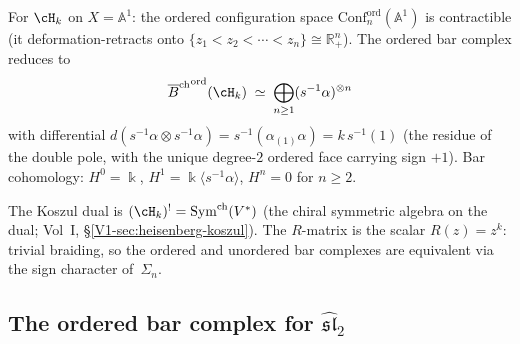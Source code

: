 \begin{computation}
For $\cH_k$ on $X=\mathbb A^1$: the ordered configuration
space $\mathrm{Conf}_n^{\mathrm{ord}}(\mathbb A^1)$ is
contractible (it deformation-retracts onto
$\{z_1<z_2<\cdots<z_n\}\cong\mathbb R^n_+$).
The ordered bar complex reduces to
\[
{\Barch}^{\mathrm{ord}}(\cH_k)
\;\simeq\;
\bigoplus_{n\ge 1}(s^{-1}\alpha)^{\otimes n}
\]
with differential $d(s^{-1}\alpha\otimes s^{-1}\alpha)
=s^{-1}(\alpha_{(1)}\alpha)=k\,s^{-1}(1)$
(the residue of the double pole, with the unique degree-$2$ ordered
face carrying sign \(+1\)). Bar cohomology:
$H^0=\Bbbk$, $H^1=\Bbbk\langle s^{-1}\alpha\rangle$,
$H^n=0$ for $n\ge 2$.

The Koszul dual is $(\cH_k)^!=\mathrm{Sym}^{\mathrm{ch}}(V^*)$
(the chiral symmetric algebra on the dual; Vol~I, \S\ref*{V1-sec:heisenberg-koszul}). The $R$-matrix is
the scalar $R(z)=z^k$: trivial braiding, so the ordered
and unordered bar complexes are equivalent via the sign
character of~$\Sigma_n$.
\end{computation}

\subsection{The ordered bar complex for $\widehat{\mathfrak{sl}}_2$}


